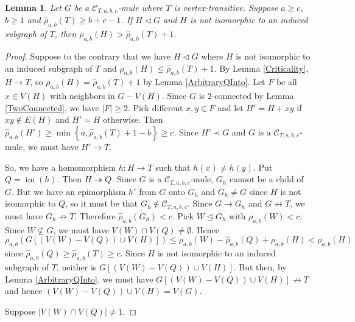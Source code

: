 \documentclass[12pt]{amsart}
\theoremstyle{plain}
\newtheorem{lem}[thm]{Lemma}
\theoremstyle{definition}
\theoremstyle{remark}
\newcommand{\fancy}[1]{\mathcal{#1}}
\newcommand{\C}{\fancy{C}}
\newcommand{\surj}{\twoheadrightarrow}
\newcommand{\set}[1]{\left\{ #1 \right\}}
\newcommand{\card}[1]{\left|#1\right|}
\newcommand{\func}[3]{#1\colon #2 \rightarrow #3}
\newcommand{\parens}[1]{\left( #1 \right)}
\newcommand{\brackets}[1]{\left[ #1 \right]}
\newcommand{\im}{\operatorname{im}}
\begin{document}
\begin{lem}
Let $G$ be a $\C_{T,a,b,c}$-mule where $T$ is vertex-transitive. Suppose $a \ge c$, $b \ge 1$ and $\hat{\rho}_{a,b}(T) \ge b + c - 1$. If $H \lhd G$ and $H$ is not isomorphic to an induced subgraph of $T$, then $\rho_{a,b}(H) > \hat{\rho}_{a,b}(T) + 1$.
\end{lem}
\begin{proof}
Suppose to the contrary that we have $H \lhd G$ where $H$ is not isomorphic to an induced subgraph of $T$ and $\rho_{a,b}(H) \le \hat{\rho}_{a,b}(T) + 1$.  By Lemma \ref{Criticality}, $H \rightarrow T$, so $\rho_{a,b}(H) = \hat{\rho}_{a,b}(T) + 1$ by Lemma \ref{ArbitraryQInto}.  Let $F$ be all $x \in V(H)$ with neighbors in $G - V(H)$.  Since $G$ is $2$-connected by Lemma \ref{TwoConnected}, we have $|F| \ge 2$.  Pick different $x,y \in F$ and let $H' = H + xy$ if $xy \not \in E(H)$ and $H' = H$ otherwise.  Then $\hat{\rho}_{a,b}(H') \ge \min\set{a, \hat{\rho}_{a,b}(T) + 1 - b} \ge c$.  Since $H' \prec G$ and $G$ is a $\C_{T,a,b,c}$-mule, we must have $H' \rightarrow T$.

So, we have a homomorphism $\func{h}{H}{T}$ such that $h(x) \ne h(y)$.  Put $Q = \im(h)$. Then $H \surj Q$. Since $G$ is a $\C_{T,a,b,c}$-mule, $G_h$ cannot be a child of $G$.  But we have an epimorphism $h'$ from $G$ onto $G_h$ and $G_h \ne G$ since $H$ is not isomorphic to $Q$, so it must be that $G_h \not \in \C_{T,a,b,c}$.  Since $G \rightarrow G_h$ and $G \not \rightarrow T$, we must have $G_h \not \rightarrow T$.  Therefore $\hat{\rho}_{a,b}(G_h) < c$.  Pick $W \unlhd G_h$ with $\rho_{a,b}(W) < c$.  Since $W \not \subseteq G$, we must have $V(W) \cap V(Q) \ne \emptyset$.  Hence $\rho_{a,b}\parens{G\brackets{(V(W) - V(Q)) \cup V(H)}} \le \rho_{a,b}(W) - \hat{\rho}_{a,b}(Q) + \rho_{a,b}(H) < \rho_{a,b}(H)$ since $\hat{\rho}_{a,b}(Q) \ge \hat{\rho}_{a,b}(T) \ge c$.  Since $H$ is not isomorphic to an induced subgraph of $T$, neither is $G\brackets{(V(W) - V(Q)) \cup V(H)}$.  But then, by Lemma \ref{ArbitraryQInto}, we must have $G\brackets{(V(W) - V(Q)) \cup V(H)} \not \rightarrow T$ and hence $(V(W) - V(Q)) \cup V(H) = V(G)$.

Suppose $\card{V(W) \cap V(Q)} \ne 1$.
\end{proof}
\end{document}
